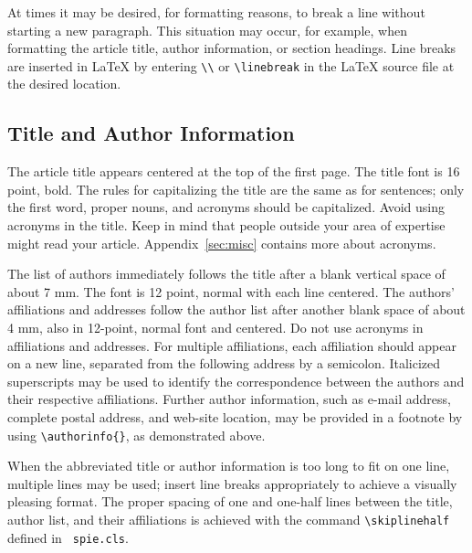 \documentclass[]{spie}  %
\begin{document}
At times it may be desired, for formatting reasons, to break a line
without starting a new paragraph.  This situation may occur, for
example, when formatting the article title, author information, or
section headings.  Line breaks are inserted in LaTeX by entering
\verb|\\| or \verb|\linebreak| in the LaTeX source file at the desired
location.


\subsection{Title and Author Information}
\label{sec:title}

The article title appears centered at the top of the first page.  The
title font is 16 point, bold.  The rules for capitalizing the title
are the same as for sentences; only the first word, proper nouns, and
acronyms should be capitalized.  Avoid using acronyms in the title.
Keep in mind that people outside your area of expertise might read
your article.  Appendix~\ref{sec:misc} contains more about acronyms.

The list of authors immediately follows the title after a blank
vertical space of about 7 mm.  The font is 12 point, normal with each
line centered.  The authors' affiliations and addresses follow the
author list after another blank space of about 4 mm, also in 12-point,
normal font and centered.  Do not use acronyms in affiliations and
addresses. For multiple affiliations, each affiliation should appear
on a new line, separated from the following address by a semicolon.
Italicized superscripts may be used to identify the correspondence
between the authors and their respective affiliations.  Further author
information, such as e-mail address, complete postal address, and
web-site location, may be provided in a footnote by using
\verb|\authorinfo{}|, as demonstrated above.

When the abbreviated title or author information is too long to fit on
one line, multiple lines may be used; insert line breaks appropriately
to achieve a visually pleasing format.  The proper spacing of one and
one-half lines between the title, author list, and their affiliations
is achieved with the command \verb|\skiplinehalf| defined in {\tt
  spie.cls}.
\end{document}
